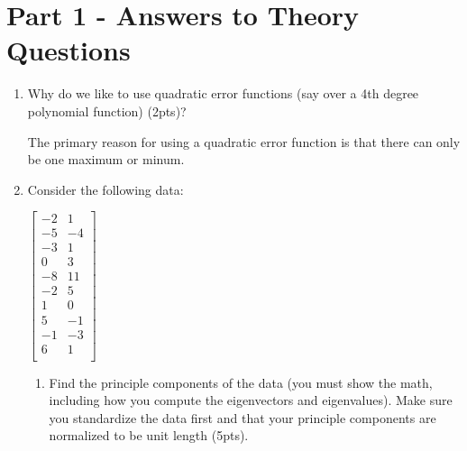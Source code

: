 \documentclass[12pt]{article}
\begin{document}
\maketitle
\section*{Part 1 - Answers to Theory Questions}
\begin{enumerate}
\item Why do we like to use quadratic error functions (say over a 4th degree polynomial function) (2pts)?

\noindent

The primary reason for using a quadratic error function is that there can only be one maximum or minum. 



\newpage
\item Consider the following data:\\
\begin{center}
$
 \begin{bmatrix}
	-2 & 1\\
	-5 & -4\\	
	-3 & 1\\
	0 & 3\\
	-8 & 11\\
	-2 & 5\\
	1 & 0\\
	5 & -1\\
	-1 & -3\\
	6 & 1\\
\end{bmatrix}
$
\end{center}
	\begin{enumerate}
	\item Find the principle components of the data (you must show the math, including how you compute the eigenvectors and eigenvalues).  Make sure you standardize the data first and that your principle components are normalized to be unit length (5pts).

\hfill \break
\hfill \break


\end{enumerate}
\end{enumerate}
\end{document}
